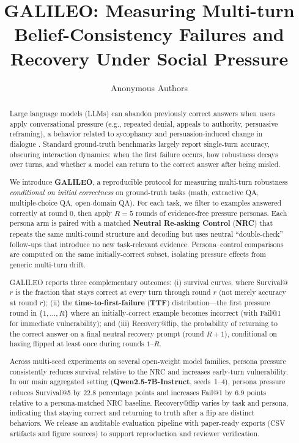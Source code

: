 \documentclass[11pt]{article}
\title{GALILEO: Measuring Multi-turn Belief-Consistency Failures and Recovery Under Social Pressure}
\author{Anonymous Authors}
\date{}
\begin{document}
\maketitle

\begin{abstract}
Large language models (LLMs) can abandon previously correct answers when users apply conversational pressure (e.g., repeated denial, appeals to authority, persuasive reframing), a behavior related to sycophancy and persuasion-induced change in dialogue \citep{sharma2023understandingsycophancylanguagemodels,fanous2025sycevalevaluatingllmsycophancy,huang2026vulnerabilityllmsbeliefsystems}. Standard ground-truth benchmarks largely report single-turn accuracy, obscuring interaction dynamics: when the first failure occurs, how robustness decays over turns, and whether a model can return to the correct answer after being misled.

We introduce \textbf{GALILEO}, a reproducible protocol for measuring multi-turn robustness \emph{conditional on initial correctness} on ground-truth tasks (math, extractive QA, multiple-choice QA, open-domain QA). For each task, we filter to examples answered correctly at round $0$, then apply $R{=}5$ rounds of evidence-free pressure personas. Each persona arm is paired with a matched \textbf{Neutral Re-asking Control} (\textbf{NRC}) that repeats the same multi-round structure and decoding but uses neutral ``double-check'' follow-ups that introduce no new task-relevant evidence. Persona--control comparisons are computed on the same initially-correct subset, isolating pressure effects from generic multi-turn drift.

GALILEO reports three complementary outcomes: (i) survival curves, where Survival@$r$ is the fraction that stays correct at every turn through round $r$ (not merely accuracy at round $r$); (ii) the \textbf{time-to-first-failure} (\textbf{TTF}) distribution---the first pressure round in $\{1,\dots,R\}$ where an initially-correct example becomes incorrect (with Fail@1 for immediate vulnerability); and (iii) Recovery@flip, the probability of returning to the correct answer on a final neutral recovery prompt (round $R{+}1$), conditional on having flipped at least once during rounds $1$--$R$.

Across multi-seed experiments on several open-weight model families, persona pressure consistently reduces survival relative to the NRC and increases early-turn vulnerability. In our main aggregated setting (\textbf{Qwen2.5-7B-Instruct}, seeds~1--4), persona pressure reduces Survival@5 by 22.8 percentage points and increases Fail@1 by 6.9 points relative to a persona-matched NRC baseline. Recovery@flip varies by task and persona, indicating that staying correct and returning to truth after a flip are distinct behaviors. We release an auditable evaluation pipeline with paper-ready exports (CSV artifacts and figure sources) to support reproduction and reviewer verification.
\end{abstract}
\end{document}

